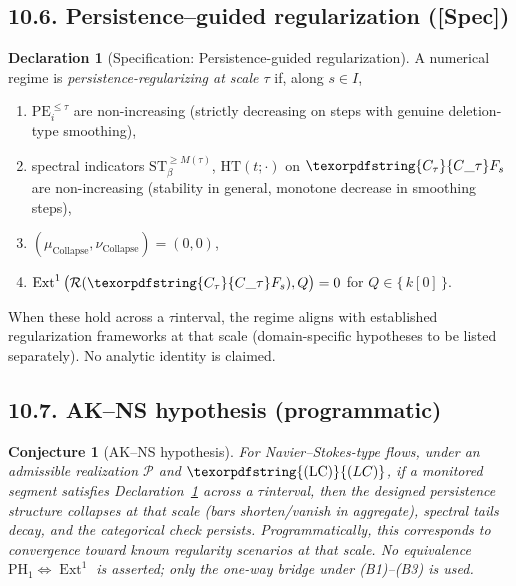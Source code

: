 \documentclass[11pt]{article}
\DeclareMathOperator{\Ext}{Ext}
\DeclareRobustCommand{\hyp}{\nobreakdash-}
\newcommand{\Rfun}{\mathcal{R}}
\numberwithin{equation}{section}
\newtheorem{conjecture}{Conjecture}[section]
\theoremstyle{definition}
\newtheorem{declaration}[theorem]{Declaration}
\DeclareRobustCommand{\Ctau}{\texorpdfstring{\ensuremath{C_{\tau}}}{C\_\tau}}
\DeclareRobustCommand{\muc}{\mu_{\mathrm{Collapse}}}
\DeclareRobustCommand{\nuc}{\nu_{\mathrm{Collapse}}}
\DeclareRobustCommand{\LC}{\texorpdfstring{\ensuremath{\mathrm{(LC)}}}{(LC)}}
\DeclareRobustCommand{\Qtest}{\{\,k[0]\,\}}
\begin{document}
\subsection*{10.6. Persistence--guided regularization ([Spec])}
\begin{declaration}[Specification: Persistence\hyp guided regularization]\label{spec:10-PGR}
A numerical regime is \emph{persistence\hyp regularizing at scale \(\tau\)} if, along \(s\in I\),
\begin{enumerate}
  \item \(\mathrm{PE}_i^{\le \tau}\) are non\hyp increasing (strictly decreasing on steps with genuine deletion\hyp type smoothing),
  \item spectral indicators \(\mathrm{ST}_\beta^{\ge M(\tau)}\), \(\mathrm{HT}(t;\cdot)\) on \(\Ctau F_s\) are non\hyp increasing (stability in general, monotone decrease in smoothing steps),
  \item \((\muc,\nuc)=(0,0)\),
  \item \(\Ext^1\big(\Rfun(\Ctau F_s),Q\big)=0\) for \(Q\in\Qtest\).
\end{enumerate}
When these hold across a \(\tau\)\nobreakdash interval, the regime aligns with established regularization frameworks at that scale (domain\hyp specific hypotheses to be listed separately). No analytic identity is claimed.
\end{declaration}

\subsection*{10.7. AK--NS hypothesis (programmatic)}
\begin{conjecture}[AK--NS hypothesis]\label{conj:10-AKNS}
For Navier–Stokes\hyp type flows, under an admissible realization \(\mathcal{P}\) and \(\LC\), if a monitored segment satisfies Declaration~\ref{spec:10-PGR} across a \(\tau\)\nobreakdash interval, then the designed persistence structure \emph{collapses} at that scale (bars shorten/vanish in aggregate), spectral tails decay, and the categorical check persists.
Programmatically, this corresponds to convergence toward known regularity scenarios at that scale.
No equivalence \(\mathrm{PH}_1\Leftrightarrow\Ext^1\) is asserted; only the one\hyp way bridge under (B1)–(B3) is used.
\end{conjecture}
\end{document}
